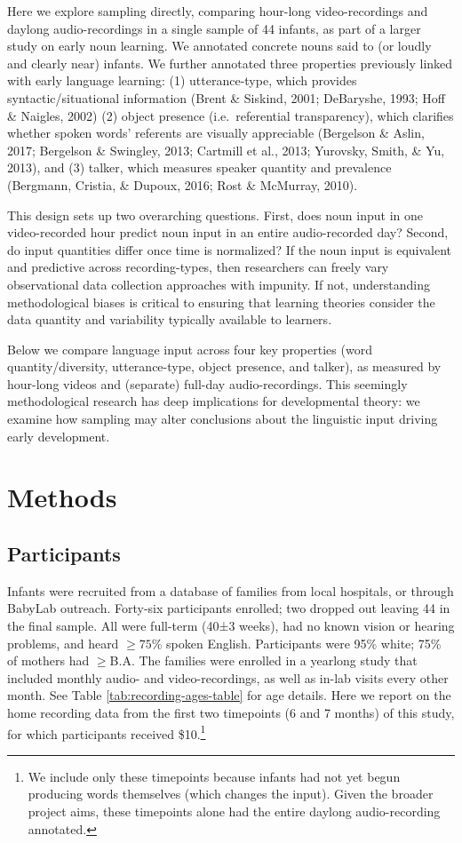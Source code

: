 \documentclass[man]{apa6}
\theoremstyle{definition}
\theoremstyle{definition}
\theoremstyle{definition}
\theoremstyle{remark}
\begin{document}
Here we explore sampling directly, comparing hour-long video-recordings
and daylong audio-recordings in a single sample of 44 infants, as part
of a larger study on early noun learning. We annotated concrete nouns
said to (or loudly and clearly near) infants. We further annotated three
properties previously linked with early language learning: (1)
utterance-type, which provides syntactic/situational information (Brent
\& Siskind, 2001; DeBaryshe, 1993; Hoff \& Naigles, 2002) (2) object
presence (i.e.~referential transparency), which clarifies whether spoken
words' referents are visually appreciable (Bergelson \& Aslin, 2017;
Bergelson \& Swingley, 2013; Cartmill et al., 2013; Yurovsky, Smith, \&
Yu, 2013), and (3) talker, which measures speaker quantity and
prevalence (Bergmann, Cristia, \& Dupoux, 2016; Rost \& McMurray, 2010).

This design sets up two overarching questions. First, does noun input in
one video-recorded hour predict noun input in an entire audio-recorded
day? Second, do input quantities differ once time is normalized? If the
noun input is equivalent and predictive across recording-types, then
researchers can freely vary observational data collection approaches
with impunity. If not, understanding methodological biases is critical
to ensuring that learning theories consider the data quantity and
variability typically available to learners.

Below we compare language input across four key properties (word
quantity/diversity, utterance-type, object presence, and talker), as
measured by hour-long videos and (separate) full-day audio-recordings.
This seemingly methodological research has deep implications for
developmental theory: we examine how sampling may alter conclusions
about the linguistic input driving early development.

\section{Methods}\label{methods}

\subsection{Participants}\label{participants}

Infants were recruited from a database of families from local hospitals,
or through BabyLab outreach. Forty-six participants enrolled; two
dropped out leaving 44 in the final sample. All were full-term (40±3
weeks), had no known vision or hearing problems, and heard \(\geq 75\%\)
spoken English. Participants were 95\% white; 75\% of mothers had
\(\geq\)B.A. The families were enrolled in a yearlong study that
included monthly audio- and video-recordings, as well as in-lab visits
every other month. See Table \ref{tab:recording-ages-table} for age
details. Here we report on the home recording data from the first two
timepoints (6 and 7 months) of this study, for which participants
received
\$10.\footnote{We include only these timepoints because infants had not yet begun producing words themselves (which changes the input). Given the broader project aims, these timepoints alone had the entire daylong audio-recording annotated.}
\end{document}
